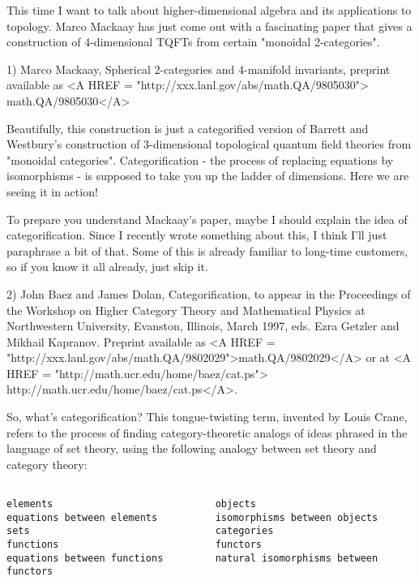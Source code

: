 

This time I want to talk about higher-dimensional algebra and its
applications to topology.  Marco Mackaay has just come out with a
fascinating paper that gives a construction of 4-dimensional TQFTs
from certain "monoidal 2-categories".  

1) Marco Mackaay, Spherical 2-categories and 4-manifold invariants,
preprint available as <A HREF = "http://xxx.lanl.gov/abs/math.QA/9805030">
math.QA/9805030</A>

Beautifully, this construction is just a categorified version of
Barrett and Westbury's construction of 3-dimensional topological
quantum field theories from "monoidal categories".
Categorification - the process of replacing equations by
isomorphisms - is supposed to take you up the ladder of dimensions.
Here we are seeing it in action!

To prepare you understand Mackaay's paper, maybe I should explain the
idea of categorification.  Since I recently wrote something about
this, I think I'll just paraphrase a bit of that.  Some of this is
already familiar to long-time customers, so if you know it all
already, just skip it.

2) John Baez and James Dolan, Categorification, to appear in the
Proceedings of the Workshop on Higher Category Theory and Mathematical
Physics at Northwestern University, Evanston, Illinois, March 1997,
eds. Ezra Getzler and Mikhail Kapranov.  Preprint available as
<A HREF = "http://xxx.lanl.gov/abs/math.QA/9802029">math.QA/9802029</A>
or at <A HREF = "http://math.ucr.edu/home/baez/cat.ps">
http://math.ucr.edu/home/baez/cat.ps</A>.

So, what's categorification?  This tongue-twisting term, invented by
Louis Crane, refers to the process of finding category-theoretic
analogs of ideas phrased in the language of set theory, using the
following analogy between set theory and category theory:

\begin{verbatim}

elements                            objects                       
equations between elements          isomorphisms between objects        
sets                                categories                    
functions                           functors                      
equations between functions         natural isomorphisms between functors  

\end{verbatim}
    
